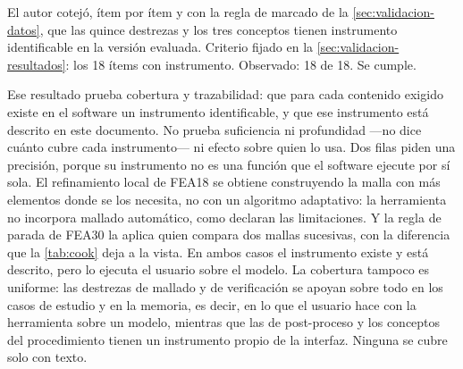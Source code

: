 {\singlespacing{}}

El autor cotejó, ítem por ítem y con la regla de marcado de la \autoref{sec:validacion-datos}, que las quince destrezas y los tres conceptos tienen instrumento identificable en la versión evaluada. Criterio fijado en la \autoref{sec:validacion-resultados}: los 18 ítems con instrumento. Observado: 18 de 18. Se cumple.

Ese resultado prueba cobertura y trazabilidad: que para cada contenido exigido existe en el software un instrumento identificable, y que ese instrumento está descrito en este documento. No prueba suficiencia ni profundidad —no dice cuánto cubre cada instrumento— ni efecto sobre quien lo usa. Dos filas piden una precisión, porque su instrumento no es una función que el software ejecute por sí sola. El refinamiento local de FEA18 se obtiene construyendo la malla con más elementos donde se los necesita, no con un algoritmo adaptativo: la herramienta no incorpora mallado automático, como declaran las limitaciones. Y la regla de parada de FEA30 la aplica quien compara dos mallas sucesivas, con la diferencia que la \autoref{tab:cook} deja a la vista. En ambos casos el instrumento existe y está descrito, pero lo ejecuta el usuario sobre el modelo. La cobertura tampoco es uniforme: las destrezas de mallado y de verificación se apoyan sobre todo en los casos de estudio y en la memoria, es decir, en lo que el usuario hace con la herramienta sobre un modelo, mientras que las de post-proceso y los conceptos del procedimiento tienen un instrumento propio de la interfaz. Ninguna se cubre solo con texto.

